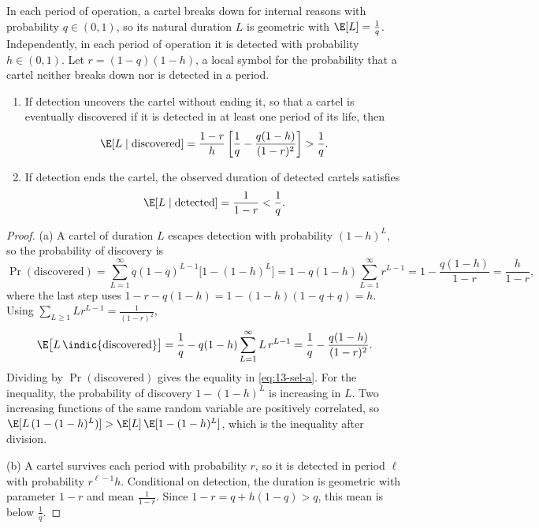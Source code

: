 \begin{proposition}\label{prop:13-selection}
In each period of operation, a cartel breaks down for internal reasons with probability $q \in (0,1)$, so its
natural duration $L$ is geometric with $\E[L] = \frac{1}{q}$. Independently, in each period of operation it is
detected with probability $h \in (0,1)$. Let $r = (1-q)(1-h)$, a local symbol for the probability that a cartel
neither breaks down nor is detected in a period.
\begin{enumerate}[label=(\alph*)]
\item If detection uncovers the cartel without ending it, so that a cartel is eventually discovered if it is
detected in at least one period of its life, then
\begin{equation}\label{eq:13-sel-a}
  \E[L \mid \text{discovered}] = \frac{1-r}{h}\left[\frac{1}{q} - \frac{q(1-h)}{(1-r)^2}\right] > \frac{1}{q} .
\end{equation}
\item If detection ends the cartel, the observed duration of detected cartels satisfies
\begin{equation}\label{eq:13-sel-b}
  \E[L \mid \text{detected}] = \frac{1}{1-r} < \frac{1}{q} .
\end{equation}
\end{enumerate}
\end{proposition}

\begin{proof}
(a) A cartel of duration $L$ escapes detection with probability $(1-h)^L$, so the probability of discovery is
\begin{equation*}
  \Pr(\text{discovered}) = \sum_{L=1}^{\infty}q(1-q)^{L-1}\bigl[1 - (1-h)^L\bigr]
  = 1 - q(1-h)\sum_{L=1}^{\infty}r^{L-1} = 1 - \frac{q(1-h)}{1-r} = \frac{h}{1-r} ,
\end{equation*}
where the last step uses $1 - r - q(1-h) = 1 - (1-h)(1 - q + q) = h$. Using $\sum_{L\geq1}Lr^{L-1} = \frac{1}{(1-r)^2}$,
\begin{equation*}
  \E\bigl[L\,\indic\{\text{discovered}\}\bigr] = \frac{1}{q} - q(1-h)\sum_{L=1}^{\infty}L\,r^{L-1}
  = \frac{1}{q} - \frac{q(1-h)}{(1-r)^2} .
\end{equation*}
Dividing by $\Pr(\text{discovered})$ gives the equality in \eqref{eq:13-sel-a}. For the inequality, the
probability of discovery $1 - (1-h)^L$ is increasing in $L$. Two increasing functions of the same random variable
are positively correlated, so $\E[L\,(1-(1-h)^L)] > \E[L]\,\E[1-(1-h)^L]$, which is the inequality after division.

(b) A cartel survives each period with probability $r$, so it is detected in period $\ell$ with probability
$r^{\ell-1}h$. Conditional on detection, the duration is geometric with parameter $1-r$ and mean $\frac{1}{1-r}$.
Since $1 - r = q + h(1-q) > q$, this mean is below $\frac{1}{q}$.
\end{proof}

